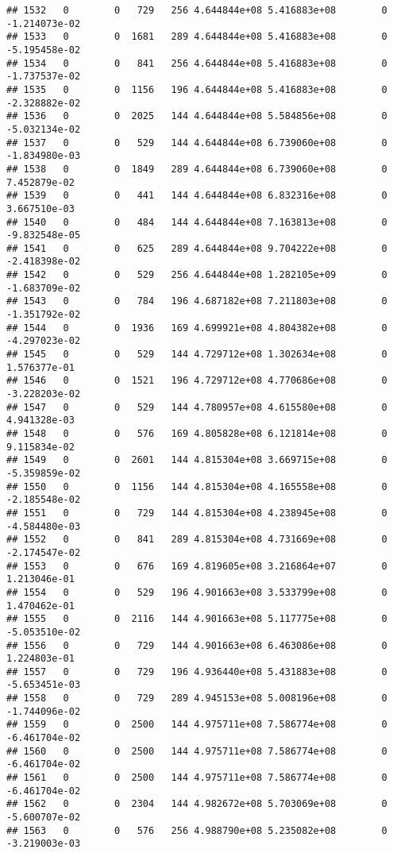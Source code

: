 \documentclass[
]{article}
\begin{document}
\begin{enumerate}
\begin{verbatim}
## 1532   0        0   729   256 4.644844e+08 5.416883e+08        0 -1.214073e-02
## 1533   0        0  1681   289 4.644844e+08 5.416883e+08        0 -5.195458e-02
## 1534   0        0   841   256 4.644844e+08 5.416883e+08        0 -1.737537e-02
## 1535   0        0  1156   196 4.644844e+08 5.416883e+08        0 -2.328882e-02
## 1536   0        0  2025   144 4.644844e+08 5.584856e+08        0 -5.032134e-02
## 1537   0        0   529   144 4.644844e+08 6.739060e+08        0 -1.834980e-03
## 1538   0        0  1849   289 4.644844e+08 6.739060e+08        0  7.452879e-02
## 1539   0        0   441   144 4.644844e+08 6.832316e+08        0  3.667510e-03
## 1540   0        0   484   144 4.644844e+08 7.163813e+08        0 -9.832548e-05
## 1541   0        0   625   289 4.644844e+08 9.704222e+08        0 -2.418398e-02
## 1542   0        0   529   256 4.644844e+08 1.282105e+09        0 -1.683709e-02
## 1543   0        0   784   196 4.687182e+08 7.211803e+08        0 -1.351792e-02
## 1544   0        0  1936   169 4.699921e+08 4.804382e+08        0 -4.297023e-02
## 1545   0        0   529   144 4.729712e+08 1.302634e+08        0  1.576377e-01
## 1546   0        0  1521   196 4.729712e+08 4.770686e+08        0 -3.228203e-02
## 1547   0        0   529   144 4.780957e+08 4.615580e+08        0  4.941328e-03
## 1548   0        0   576   169 4.805828e+08 6.121814e+08        0  9.115834e-02
## 1549   0        0  2601   144 4.815304e+08 3.669715e+08        0 -5.359859e-02
## 1550   0        0  1156   144 4.815304e+08 4.165558e+08        0 -2.185548e-02
## 1551   0        0   729   144 4.815304e+08 4.238945e+08        0 -4.584480e-03
## 1552   0        0   841   289 4.815304e+08 4.731669e+08        0 -2.174547e-02
## 1553   0        0   676   169 4.819605e+08 3.216864e+07        0  1.213046e-01
## 1554   0        0   529   196 4.901663e+08 3.533799e+08        0  1.470462e-01
## 1555   0        0  2116   144 4.901663e+08 5.117775e+08        0 -5.053510e-02
## 1556   0        0   729   144 4.901663e+08 6.463086e+08        0  1.224803e-01
## 1557   0        0   729   196 4.936440e+08 5.431883e+08        0 -5.653451e-03
## 1558   0        0   729   289 4.945153e+08 5.008196e+08        0 -1.744096e-02
## 1559   0        0  2500   144 4.975711e+08 7.586774e+08        0 -6.461704e-02
## 1560   0        0  2500   144 4.975711e+08 7.586774e+08        0 -6.461704e-02
## 1561   0        0  2500   144 4.975711e+08 7.586774e+08        0 -6.461704e-02
## 1562   0        0  2304   144 4.982672e+08 5.703069e+08        0 -5.600707e-02
## 1563   0        0   576   256 4.988790e+08 5.235082e+08        0 -3.219003e-03

\end{verbatim}
\end{enumerate}
\end{document}
